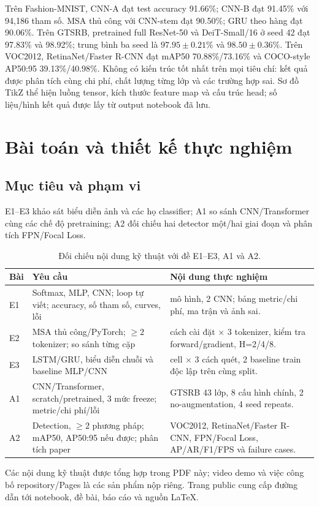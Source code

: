 \documentclass[12pt,a4paper,oneside]{report}
\begin{document}
Trên Fashion-MNIST, CNN-A đạt test accuracy 91.66\%; CNN-B đạt 91.45\%
với 94,186 tham số. MSA thủ công với CNN-stem đạt 90.50\%; GRU theo hàng đạt 90.06\%.
Trên GTSRB, pretrained full ResNet-50 và DeiT-Small/16 ở seed 42 đạt
97.83\% và 98.92\%; trung bình ba seed là $97.95\pm 0.21\%$ và
$98.50\pm 0.36\%$. Trên VOC2012, RetinaNet/Faster R-CNN đạt mAP50
70.88\%/73.16\% và COCO-style AP50:95 39.13\%/40.98\%.
Không có kiến trúc tốt nhất trên mọi tiêu chí: kết quả được phân tích cùng
chi phí, chất lượng từng lớp và các trường hợp sai. Sơ đồ TikZ thể hiện
luồng tensor, kích thước feature map và cấu trúc head; số liệu/hình kết quả
được lấy từ output notebook đã lưu.
\tableofcontents
\clearpage{}
\chapter{Bài toán và thiết kế thực nghiệm}
\section{Mục tiêu và phạm vi}
E1--E3 khảo sát biểu diễn ảnh và các họ classifier; A1 so sánh
CNN/Transformer cùng các chế độ pretraining; A2 đối chiếu hai detector
một/hai giai đoạn và phân tích FPN/Focal Loss.

\begin{table}[H]\centering\caption{Đối chiếu nội dung kỹ thuật với đề E1--E3, A1 và A2.}
\small\begin{tabularx}{\linewidth}{l>{\raggedright\arraybackslash}X>{\raggedright\arraybackslash}X}\toprule
Bài & Yêu cầu & Nội dung thực nghiệm\\\midrule
E1 & Softmax, MLP, CNN; loop tự viết; accuracy, số tham số, curves, lỗi
& 4 mô hình, 2 CNN; bảng metric/chi phí, ma trận và ảnh sai.\\
E2 & MSA thủ công/PyTorch; $\geq 2$ tokenizer; so sánh từng cặp
& 2 cách cài đặt $\times$ 3 tokenizer, kiểm tra forward/gradient, H=2/4/8.\\
E3 & LSTM/GRU, biểu diễn chuỗi và baseline MLP/CNN
& 2 cell $\times$ 3 cách quét, 2 baseline train độc lập trên cùng split.\\
A1 & CNN/Transformer, scratch/pretrained, 3 mức freeze; metric/chi phí/lỗi
& GTSRB 43 lớp, 8 cấu hình chính, 2 no-augmentation, 4 seed repeats.\\
A2 & Detection, $\geq 2$ phương pháp; mAP50, AP50:95 nếu được; phân tích paper
& VOC2012, RetinaNet/Faster R-CNN, FPN/Focal Loss, AP/AR/F1/FPS và failure cases.\\\bottomrule
\end{tabularx}\label{table:main-1}
\end{table}
Các nội dung kỹ thuật được tổng hợp trong PDF này; video demo và việc công
bố repository/Pages là các sản phẩm nộp riêng. Trang public cung cấp đường
dẫn tới notebook, đề bài, báo cáo và nguồn LaTeX.
\end{document}
